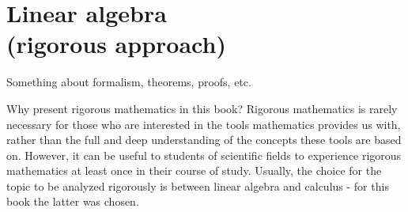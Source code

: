 \chapter{Linear algebra\\(rigorous approach)}\label{chapter:linear algebra rigorous}
Something about formalism, theorems, proofs, etc.

\begin{note}{Why present rigorous mathematics in this book?}{ }
	Rigorous mathematics is rarely necessary for those who are interested in the tools mathematics provides us with, rather than the full and deep understanding of the concepts these tools are based on. However, it can be useful to students of scientific fields to experience rigorous mathematics at least once in their course of study. Usually, the choice for the topic to be analyzed rigorously is between linear algebra and calculus - for this book the latter was chosen.
\end{note}

